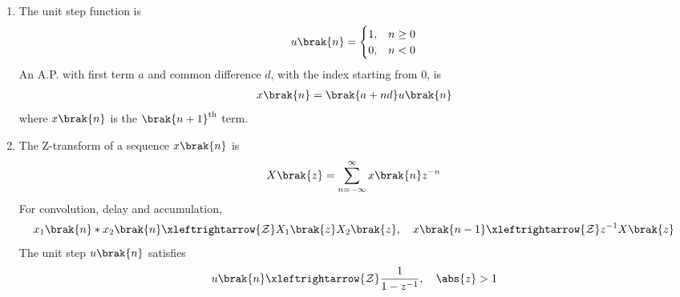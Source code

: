 \begin{enumerate}[label=\thesubsection.\arabic*, ref=\thesubsection.\theenumi]
\begin{align}
	\label{eq:EE26BTECH11229-contact}
\end{align}
\solution
The line $\vec{x} = \vec{h} + \mu\vec{m}$ is tangent to the circle if \eqref{eq:EE26BTECH11229-conic-line}, with $\vec{V} = \vec{I}$, has equal roots,
\begin{align}
	\brak{\vec{m}^{\top}\brak{\vec{h}+\vec{u}}}^2 - g\brak{\vec{h}}\vec{m}^{\top}\vec{m} = \vec{m}^{\top}\vec{\Sigma}\vec{m} = 0
\end{align}
Substituting $\vec{m} = \vec{P}\vec{y}$ and using $\vec{P}^{\top}\vec{\Sigma}\vec{P} = \vec{D}$,
\begin{align}
	\lambda_1 y_1^2 + \lambda_2 y_2^2 = 0
\end{align}
Since $\lambda_1$ and $\lambda_2$ have opposite signs, this is satisfied by $\vec{y} = \myvec{\sqrt{\abs{\lambda_2}} \\ \pm\sqrt{\abs{\lambda_1}}}$, yielding \eqref{eq:EE26BTECH11229-tangent-dir}. The equal root of \eqref{eq:EE26BTECH11229-conic-line} is $\mu = -\frac{\vec{m}^{\top}\brak{\vec{h}+\vec{u}}}{\vec{m}^{\top}\vec{m}}$, yielding \eqref{eq:EE26BTECH11229-contact}.
\item The unit step function is
\begin{align}
	u\brak{n} =
	\begin{cases}
		1, & n \ge 0
		\\
		0, & n < 0
	\end{cases}
\end{align}
An A.P. with first term $a$ and common difference $d$, with the index starting from $0$, is
\begin{align}
	x\brak{n} = \brak{a + nd}u\brak{n}
	\label{eq:EE26BTECH11229-ap-step}
\end{align}
where $x\brak{n}$ is the $\brak{n+1}^{\text{th}}$ term.
\item The Z-transform of a sequence $x\brak{n}$ is
\begin{align}
	X\brak{z} = \sum_{n=-\infty}^{\infty} x\brak{n}z^{-n}
\end{align}
For convolution, delay and accumulation,
\begin{align}
	x_1\brak{n} * x_2\brak{n} \xleftrightarrow{\mathcal{Z}} X_1\brak{z}X_2\brak{z}, \quad
	x\brak{n-1} \xleftrightarrow{\mathcal{Z}} z^{-1}X\brak{z}
	\label{eq:EE26BTECH11229-z-prop}
\end{align}
The unit step $u\brak{n}$ satisfies
\begin{align}
	u\brak{n} \xleftrightarrow{\mathcal{Z}} \frac{1}{1 - z^{-1}}, \quad \abs{z} > 1
\end{align}

\end{enumerate}
